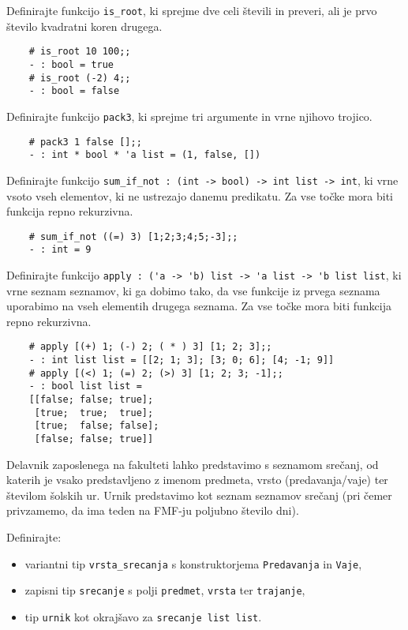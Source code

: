 \documentclass[arhiv]{../izpit}
\begin{document}
	
	
	
	\naloga
	
	\podnaloga Definirajte funkcijo \verb|is_root|, ki sprejme dve celi števili in preveri, ali je prvo število kvadratni koren drugega. 
	
	\begin{verbatim}
	# is_root 10 100;;
	- : bool = true
	# is_root (-2) 4;;
	- : bool = false
	\end{verbatim}
	
	\podnaloga Definirajte funkcijo \verb|pack3|, ki sprejme tri argumente in vrne njihovo trojico.
	\begin{verbatim}
	# pack3 1 false [];;
	- : int * bool * 'a list = (1, false, [])
	\end{verbatim}
	
	\podnaloga Definirajte funkcijo \verb|sum_if_not : (int -> bool) -> int list -> int|, ki vrne vsoto vseh elementov, ki ne ustrezajo danemu predikatu. Za vse točke mora biti funkcija repno rekurzivna.
	
	\begin{verbatim}
	# sum_if_not ((=) 3) [1;2;3;4;5;-3];;
	- : int = 9
	\end{verbatim}
	
	\podnaloga Definirajte funkcijo \verb|apply : ('a -> 'b) list -> 'a list -> 'b list list|, ki vrne seznam seznamov, ki ga dobimo tako, da vse funkcije iz prvega seznama uporabimo na vseh elementih drugega seznama. Za vse točke mora biti funkcija repno rekurzivna.
	
	\begin{verbatim}
	# apply [(+) 1; (-) 2; ( * ) 3] [1; 2; 3];;
	- : int list list = [[2; 1; 3]; [3; 0; 6]; [4; -1; 9]]
	# apply [(<) 1; (=) 2; (>) 3] [1; 2; 3; -1];;
	- : bool list list =
	[[false; false; true]; 
	 [true;  true;  true];
	 [true;  false; false]; 
	 [false; false; true]]
	\end{verbatim}

	
	\naloga
	Delavnik zaposlenega na fakulteti lahko predstavimo s seznamom srečanj, od katerih je vsako predstavljeno z imenom predmeta, vrsto (predavanja/vaje) ter številom šolskih ur. Urnik predstavimo kot seznam seznamov srečanj (pri čemer privzamemo, da ima teden na FMF-ju poljubno število dni).
	
	\podnaloga 
	Definirajte:
	\begin{itemize}
		\item variantni tip \verb|vrsta_srecanja| s konstruktorjema \verb|Predavanja| in \verb|Vaje|,
		\item zapisni tip \verb|srecanje| s polji \verb|predmet|, \verb|vrsta| ter \verb|trajanje|,
		\item tip \verb|urnik| kot okrajšavo za \verb|srecanje list list|.
	\end{itemize}
\end{document}

